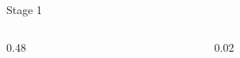 \documentclass[final]{beamer}
\newlength{\onecolwid}
\newlength{\twocolwid}
\begin{document}
\begin{frame}[t]
\begin{columns}[t]
\begin{column}{\twocolwid}
\begin{block}{Stage 1}
\begin{columns}[t,totalwidth=\twocolwid]
\begin{column}{0.48\twocolwid}
%
%

\end{column}

\begin{column}{0.02\twocolwid}
\end{column}



\end{columns}




%
%
%
%
%
%
%
%
%
%
%
%
%



\end{block}



\vspace{2cm}


\begin{columns}[t,totalwidth=\twocolwid] %


\end{columns}
\end{column}
\end{columns}
\end{frame}
\end{document}
